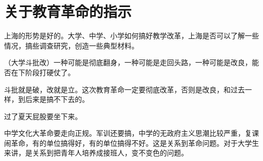 \section[关于教育革命的指示（一九六七年七月）]{关于教育革命的指示}


上海的形势是好的。大学、中学、小学如何搞好教学改革，上海是否可以了解一些情况，搞些调查研究，创造一些典型材料。


（大学斗批改）一种可能是彻底翻身，一种可能是走回头路，一种可能是改良，能否在下阶段打硬仗了。

斗批就是破，改就是立。这次教育革命一定要彻底改革，否则是改良，和过去一样，到后来是搞不下去的。

过了夏天屁股要坐下来。


中学文化大革命要走向正规。军训还要搞，中学的无政府主义思潮比较严重，复课闹革命，有的单位搞得好，有的单位搞得不好。这是关系到革命问题。对于大学生来讲，是关系到把青年人培养成接班人，变不变色的问题。

